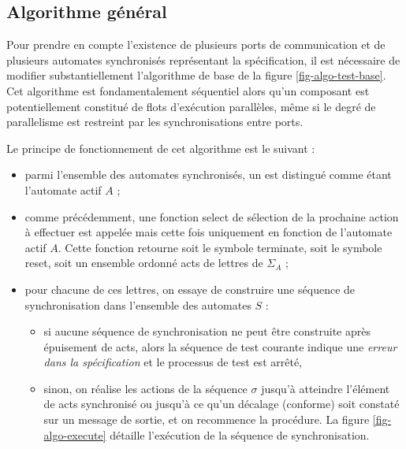 \subsection{Algorithme g\'en\'eral}

Pour prendre en compte l'existence de plusieurs ports de communication
et de plusieurs automates synchronis\'es repr\'esentant la
sp\'ecification, il est n\'ecessaire de modifier substantiellement l'algorithme de
base de la figure \ref{fig-algo-test-base}. Cet algorithme est
fondamentalement s\'equentiel alors qu'un composant est
potentiellement constitu\'e de flots d'ex\'ecution parall\`eles,
m\^eme si le degr\'e de parallelisme est restreint par les
synchronisations entre ports.

Le principe de fonctionnement de cet algorithme est le suivant :
\begin{itemize}
  \item parmi l'ensemble des automates synchronis\'es, un est
    distingu\'e comme \'etant l'automate actif $A$ ;
  \item comme pr\'ec\'edemment, une fonction \textsf{select} de
    s\'election de la prochaine action \`a effectuer est
    appel\'ee mais cette fois uniquement en fonction de l'automate
    actif $A$. Cette fonction retourne soit le symbole
    \textsf{terminate},
    soit le symbole \textsf{reset}, soit un ensemble ordonn\'e
    \textsf{acts} de lettres de $\Sigma_A$ ;
  \item pour chacune de ces lettres, on essaye de construire une
    s\'equence de synchronisation dans l'ensemble des automates
    $S$ : 
    \begin{itemize}
      \item si aucune s\'equence de synchronisation ne peut \^etre
        construite apr\`es \'epuisement de \textsf{acts}, alors la
        s\'equence de test courante indique une \emph{erreur dans la
          sp\'ecification} et le processus de test est arr\^et\'e,
      \item sinon, on r\'ealise les actions de
        la s\'equence $\sigma$ jusqu'\`a atteindre l'\'el\'ement de
        \textsf{acts} synchronis\'e ou jusqu'\`a ce qu'un d\'ecalage
        (conforme) soit constat\'e sur un message de sortie, et on
        recommence la proc\'edure. La figure \ref{fig-algo-execute}
        d\'etaille l'ex\'ecution de la s\'equence de synchronisation.
    \end{itemize}
\end{itemize}


